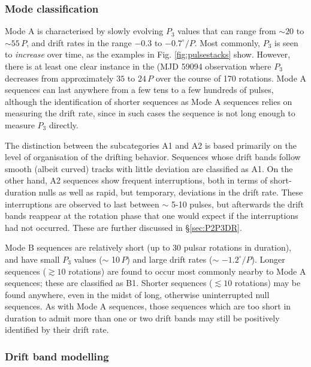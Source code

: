 \documentclass[twocolumn]{aastex631}
\begin{document}
\subsubsection{Mode classification}

Mode A is characterised by slowly evolving $P_3$ values that can range from $\sim20$ to $\sim55\,P$, and drift rates in the range $-0.3$ to $-0.7^\circ/P$.
Most commonly, $P_3$ is seen to \textit{increase} over time, as the examples in Fig. \ref{fig:pulsestacks} show.
However, there is at least one clear instance in the (MJD 59094 observation where $P_3$ decreases from approximately $35$ to $24\,P$ over the course of 170 rotations.
Mode A sequences can last anywhere from a few tens to a few hundreds of pulses, although the identification of shorter sequences as Mode A sequences relies on measuring the drift rate, since in such cases the sequence is not long enough to measure $P_3$ directly.

The distinction between the subcategories A1 and A2 is based primarily on the level of organisation of the drifting behavior.
Sequences whose drift bands follow smooth (albeit curved) tracks with little deviation are classified as A1.
On the other hand, A2 sequences show frequent interruptions, both in terms of short-duration nulls as well as rapid, but temporary, deviations in the drift rate.
These interruptions are observed to last between $\sim$ 5-10 pulses, but afterwards the drift bands reappear at the rotation phase that one would expect if the interruptions had not occurred.
These are further discussed in \S\ref{sec:P2P3DR}.

Mode B sequences are relatively short (up to 30 pulsar rotations in duration), and have small $P_3$ values ($\sim$ 10\,$P$) and large drift rates ($\sim$ $-1.2^\circ/P$).
Longer sequences ($\gtrsim 10$ rotations) are found to occur most commonly nearby to Mode A sequences; these are classified as B1.
Shorter sequences ($\lesssim 10$ rotations) may be found anywhere, even in the midst of long, otherwise uninterrupted null sequences.
As with Mode A sequences, those sequences which are too short in duration to admit more than one or two drift bands may still be positively identified by their drift rate.

\subsubsection{Drift band modelling}
\end{document}
